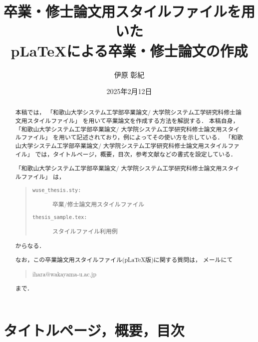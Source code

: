 \documentclass[11pt]{jreport}
\title{卒業・修士論文用スタイルファイルを用いた\\
       p\LaTeX による卒業・修士論文の作成}
\author{伊原 彰紀}
\date{2025年2月12日}	%
\begin{document}
\maketitle

\begin{abstract}
本稿では，
「和歌山大学システム工学部卒業論文/
  大学院システム工学研究科修士論文用スタイルファイル」
を用いて卒業論文を作成する方法を解説する．
本稿自身，
「和歌山大学システム工学部卒業論文/
  大学院システム工学研究科修士論文用スタイルファイル」
を用いて記述されており，例によってその使い方を示している．
「和歌山大学システム工学部卒業論文/
  大学院システム工学研究科修士論文用スタイルファイル」
では，タイトルページ，概要，目次，参考文献などの書式を設定している．

「和歌山大学システム工学部卒業論文/
  大学院システム工学研究科修士論文用スタイルファイル」
は，
\begin{quote}
  \begin{description}
    \item[\tt wuse\_thesis.sty:] 卒業/修士論文用スタイルファイル
    \item[\tt thesis\_sample.tex:] スタイルファイル利用例
  \end{description}
\end{quote}
からなる．

なお，この卒業論文用スタイルファイル(p\LaTeX 版)に関する質問は，
メールにて
\begin{quote}
ihara@wakayama-u.ac.jp
\end{quote}
まで．

\end{abstract}

\tableofcontents



\newpage
{}	%



\chapter{タイトルページ，概要，目次}
\end{document}
